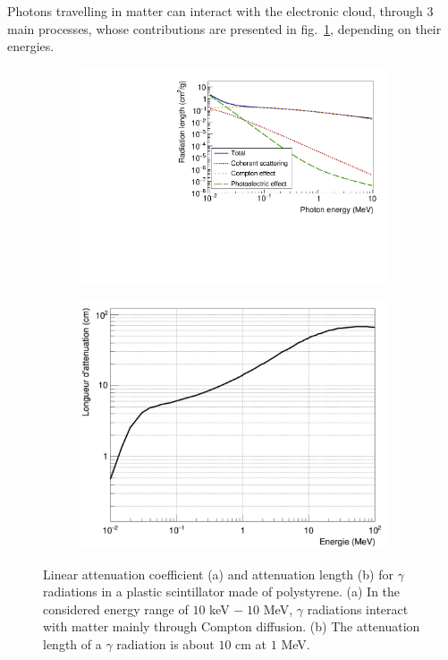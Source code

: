 Photons travelling in  matter can interact with the electronic cloud, through $3$ main processes, whose contributions are presented in fig.~\ref{subfig:photon_energy_loss}, depending on their energies.
\begin{figure}[h]
  \centering
  \begin{subfigure}[t]{0.48\textwidth}
    \centering
    \includegraphics[width=1\textwidth]{commissioning/fig_commissioning/photon_energy_loss.pdf}
    \captionsetup{justification=centering}
    \caption{\label{subfig:photon_energy_loss}}
  \end{subfigure}
  \hfill
  \begin{subfigure}[t]{0.48\textwidth}
    \centering
    \includegraphics[width=1\textwidth]{commissioning/fig_commissioning/attenuation_length_photons.pdf}
    \captionsetup{justification=centering}
    \caption{\label{subfig:attenuation_length_photons}}
  \end{subfigure}
  \caption{Linear attenuation coefficient (a) and attenuation length (b) for $\gamma$ radiations in a plastic scintillator made of polystyrene.
    (a) In the considered energy range of $10$ keV $ -\; 10$ MeV, $\gamma$ radiations interact with matter mainly through Compton diffusion.
    (b) The attenuation length of a $\gamma$ radiation is about $10$ cm at $1$ MeV.
  }
\end{figure}
